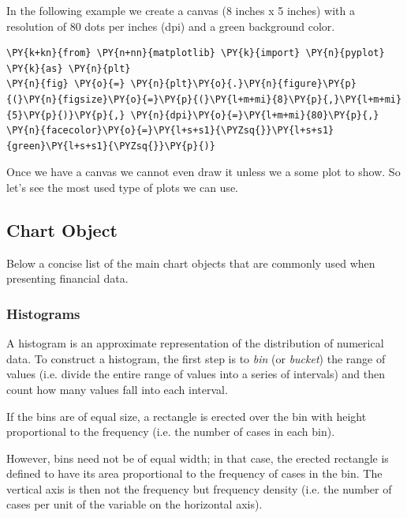 In the following example we create a canvas (8 inches x 5 inches) with a
resolution of 80 dots per inches (dpi) and a green background color.

\begin{tcolorbox}[breakable, size=fbox, boxrule=1pt, pad at break*=1mm,colback=cellbackground, colframe=cellborder]
\begin{Verbatim}[commandchars=\\\{\}]
\PY{k+kn}{from} \PY{n+nn}{matplotlib} \PY{k}{import} \PY{n}{pyplot} \PY{k}{as} \PY{n}{plt}
\PY{n}{fig} \PY{o}{=} \PY{n}{plt}\PY{o}{.}\PY{n}{figure}\PY{p}{(}\PY{n}{figsize}\PY{o}{=}\PY{p}{(}\PY{l+m+mi}{8}\PY{p}{,}\PY{l+m+mi}{5}\PY{p}{)}\PY{p}{,} \PY{n}{dpi}\PY{o}{=}\PY{l+m+mi}{80}\PY{p}{,} \PY{n}{facecolor}\PY{o}{=}\PY{l+s+s1}{\PYZsq{}}\PY{l+s+s1}{green}\PY{l+s+s1}{\PYZsq{}}\PY{p}{)}
\end{Verbatim}
\end{tcolorbox}

Once we have a canvas we cannot even draw it unless we a some plot to
show. So let's see the most used type of plots we can use.

\subsection{Chart Object}\label{chart-object}

Below a concise list of the main chart objects that are commonly used
when presenting financial data.

\subsubsection{Histograms}\label{histograms}

A histogram is an approximate representation of the distribution of
numerical data. To construct a histogram, the first step is to \emph{bin}
(or \emph{bucket}) the range of values (i.e. divide the entire range of
values into a series of intervals) and then count how many values fall
into each interval.

If the bins are of equal size, a rectangle is erected over the bin with
height proportional to the frequency (i.e. the number of cases in each
bin).

However, bins need not be of equal width; in that case, the erected
rectangle is defined to have its area proportional to the frequency of
cases in the bin. The vertical axis is then not the frequency but
frequency density (i.e. the number of cases per unit of the variable on
the horizontal axis).

